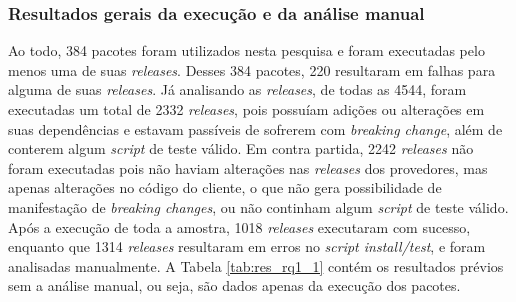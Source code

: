 \subsubsection{Resultados gerais da execução e da análise manual}


Ao todo, 384 pacotes foram utilizados nesta pesquisa e foram executadas pelo menos uma de suas \textit{releases}. Desses 384 pacotes, 220 resultaram em falhas para alguma de suas \textit{releases}. Já analisando as \textit{releases}, de todas as 4544, foram executadas um total de 2332 \textit{releases}, pois possuíam adições ou alterações em suas dependências e estavam passíveis de sofrerem com \textit{breaking change}, além de conterem algum \textit{script} de teste válido. Em contra partida, 2242 \textit{releases} não foram executadas pois não haviam alterações nas \textit{releases} dos provedores, mas apenas alterações no código do cliente, o que não gera possibilidade de manifestação de \textit{breaking changes}, ou não continham algum \textit{script} de teste válido. Após a execução de toda a amostra, 1018 \textit{releases} executaram com sucesso, enquanto que 1314 \textit{releases} resultaram em erros no \textit{script install/test}, e foram analisadas manualmente. A Tabela \ref{tab:res_rq1_1} contém os resultados prévios sem a análise manual, ou seja, são dados apenas da execução dos pacotes.

